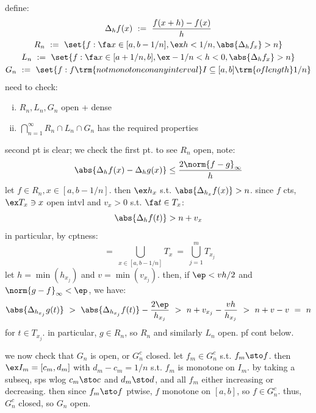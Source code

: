 \begin{pf}[source=Primary Source Material]
	define:
	\begin{gather*}
		\Delta_{h}f(x) \ := \ \frac{f(x+h)-f(x)}{h} \\
		R_{n} \ := \ \set{f:\fa x\in[a,b-1/n],\ex h<1/n,\abs{\Delta_{h}f_{x}}>n} \\
		L_{n} \ := \ \set{f:\fa x\in[a+1/n,b],\ex -1/n<h<0,\abs{\Delta_{h}f_{x}}>n} \\
		G_{n} \ := \ \set{f: f \trm{ not monotone on any interval } I\subseteq[a,b] \trm{ of length } 1/n}
	\end{gather*}
	need to check:
	\begin{enumerate}[i)]
		\item $R_{n},L_{n},G_{n}$ open + dense
		\item $\bigcap_{n=1}^{\infty}R_{n}\cap L_{n}\cap G_{n}$ has the required properties
	\end{enumerate}
	second pt is clear; we check the first pt.
	to see $R_{n}$ open, note:
	\begin{equation*}
		\abs{\Delta_{h}f(x)-\Delta_{h}g(x)}\leq\frac{2\norm{f-g}_{\infty}}{h}
	\end{equation*}
	let $f\in R_{n},x\in[a,b-1/n]$. then $\ex h_{x}$ s.t. $\abs{\Delta_{h_{x}}f(x)}>n$.
	since $f$ cts, $\ex T_{x}\ni x$ open intvl and $v_{x}>0$ s.t. $\fa t\in T_{x}$:
	\begin{equation*}
		\abs{\Delta_{h}f(t)}>n+v_{x}
	\end{equation*}
	in particular, by cptness:
	\begin{equation*}
		[a,b-1/n] \ = \ \bigcup_{x\in[a,b-1/n]}T_{x} \ = \ \bigcup_{j=1}^{m}T_{x_{j}}
	\end{equation*}
	let $h=\min(h_{x_{j}})$ and $v=\min(v_{x_{j}})$.
	then, if $\ep<vh/2$ and $\norm{g-f}_{\infty}<\ep$, we have:
	\begin{equation*}
		\abs{\Delta_{h_{x_{j}}}g(t)} \ > \ \abs{\Delta_{h_{x_{j}}}f(t)}-\frac{2\ep}{h_{x_{j}}}
		\ > \ n+v_{x_{j}}-\frac{vh}{h_{x_{j}}} \ > \ n+v-v \ = \ n
	\end{equation*}
	for $t\in T_{x_{j}}$. in particular, $g\in R_{n}$, so $R_{n}$ and similarly $L_{n}$ open.
	pf cont below.
\end{pf}


we now check that $G_{n}$ is open, or $G_{n}^{c}$ closed.
let $f_{m}\in G_{n}^{c}$ s.t. $f_{m}\sto f$.
then $\ex I_{m}=[c_{m},d_{m}]$ with $d_{m}-c_{m}=1/n$ s.t. $f_{m}$ is monotone
on $I_{m}$.
by taking a subseq, sps wlog $c_{m}\sto c$ and $d_{m}\sto d$, and all
$f_{m}$ either increasing or decreasing.
then since $f_{m}\sto f$ ptwise, $f$ monotone on $[a,b]$, so $f\in G_{n}^{c}$.
thus, $G_{n}^{c}$ closed, so $G_{n}$ open.

